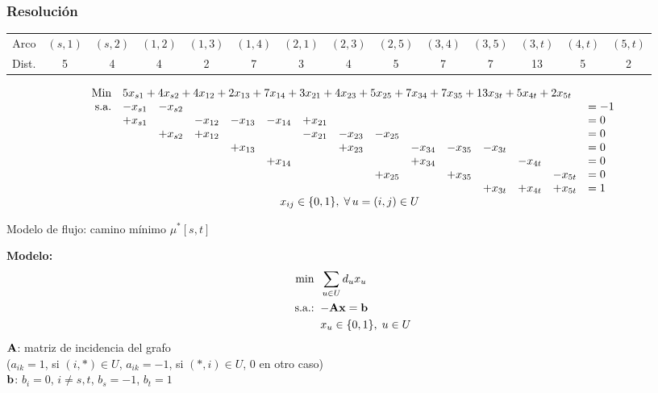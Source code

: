 \documentclass[aspectratio=169]{beamer}
\begin{document}
\begin{frame}
	
	\frametitle{Resoluci\'on}

{\tiny 
    \begin{center}
        \begin{tabular}{|r|ccccccccccccc|}
        \hline
        Arco & $(s,1)$ & $(s,2)$ & $(1,2)$ & $(1,3)$ & $(1,4)$ & $(2,1)$ & $(2,3)$ & $(2,5)$ &
        $(3,4)$ & $(3,5)$ & $(3,t)$ & $(4,t)$ & $(5,t)$ 
        \\
        Dist. & 5 &	4 &	4 &	2 &	7 &	3 &	4 &	5 &	7 &	7 &	13 & 5 & 2
        \\
        \hline
        \end{tabular}
    \end{center}
}	

{\small
$$
\begin{array}{rrrrrrrrrrrrrrl}
\text{Min} & \multicolumn{14}{l}{5x_{s1}+	4x_{s2}+	4x_{12}+	2x_{13}+	7x_{14}+	3x_{21}+	4x_{23}+	5x_{25}+	7x_{34}+	7x_{35}+	13x_{3t}+	5x_{4t}+	2x_{5t}}
\\
\text{s.a.} & -x_{s1} & - x_{s2} & & & & & & & & & & & & = -1
\\
& +x_{s1} & &-x_{12} & -x_{13} & -x_{14} & +x_{21} & & & & & & &  & =  0
\\
&  & +x_{s2} &+x_{12} &  &  & -x_{21} & -x_{23} & -x_{25} & & & & &  & =  0
\\
&  &  & & +x_{13} &  &  & +x_{23} &  & -x_{34} & -x_{35} & -x_{3t} & &  & =  0
\\
&  &  & &  & +x_{14}  &  &  &  & +x_{34} &  &  & -x_{4t} &  & =  0

\\
&  &  & &  &  &  &  & +x_{25}  &  & +x_{35}  &  &  & -x_{5t} & =  0
\\
&  &  & &  &  &  &  &  &  &   & +x_{3t}  & +x_{4t} & +x_{5t} & =  1
\\
& \multicolumn{13}{c}{x_{ij}\in \{0,1\}, \; \forall \, u=(i,j)\in U} &
\end{array}
$$
}
	
\end{frame}

\begin{frame}{Modelo de flujo: camino mínimo $\mu^*[s,t]$}
	
	\textbf{Modelo:}
	\begin{align*}
		\min\;\;     & \sum_{u\in U} d_u x_{u} \\
		\textrm{s.a.:\;\;} &   {\bf -A x}={\bf b} \\
		&   x_{u} \in \{0,1\}, \; u\in U
	\end{align*}
%
${\bf A}$: matriz de \alert{incidencia} del grafo
\\
\hspace*{0.5cm} ($a_{ik}=1$, si $(i,*)\in U$, $a_{ik}=-1$, si $(*,i)\in U$, 0 en otro caso)
\\
${\bf b}$: $b_i=0$, $i\neq s,t$, $b_s=-1$, $b_t=1$
\end{frame}
\end{document}
